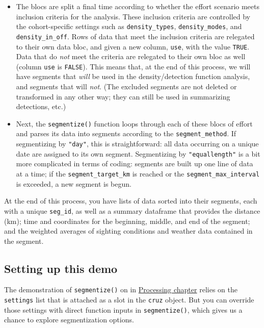 \documentclass[
]{book}
\begin{document}
\begin{itemize}
\item
  The blocs are split a final time according to whether the effort scenario meets inclusion criteria for the analysis. These inclusion criteria are controlled by the cohort-specific settings such as \texttt{density\_types}, \texttt{density\_modes}, and \texttt{density\_in\_off}. Rows of data that meet the inclusion criteria are relegated to their own data bloc, and given a new column, \texttt{use}, with the value \texttt{TRUE}. Data that do \emph{not} meet the criteria are relegated to their own bloc as well (column \texttt{use} is \texttt{FALSE}). This means that, at the end of this process, we will have segments that \emph{will} be used in the density/detection function analysis, and segments that will \emph{not}. (The excluded segments are not deleted or transformed in any other way; they can still be used in summarizing detections, etc.)
\item
  Next, the \texttt{segmentize()} function loops through each of these blocs of effort and parses its data into segments according to the \texttt{segment\_method}. If segmentizing by \texttt{"day"}, this is straightforward: all data occurring on a unique date are assigned to its own segment. Segmentizing by \texttt{"equallength"} is a bit more complicated in terms of coding: segments are built up one line of data at a time; if the \texttt{segment\_target\_km} is reached or the \texttt{segment\_max\_interval} is exceeded, a new segment is begun.
\end{itemize}

At the end of this process, you have lists of data sorted into their segments, each with a unique \texttt{seg\_id}, as well as a summary dataframe that provides the distance (km); time and coordinates for the beginning, middle, and end of the segment; and the weighted averages of sighting conditions and weather data contained in the segment.

\hypertarget{setting-up-this-demo}{%
\subsection*{Setting up this demo}\label{setting-up-this-demo}}

The demonstration of \texttt{segmentize()} on in \protect\hyperlink{processing}{Processing chapter} relies on the \texttt{settings} list that is attached as a slot in the \texttt{cruz} object. But you can override those settings with direct function inputs in \texttt{segmentize()}, which gives us a chance to explore segmentization options.
\end{document}
